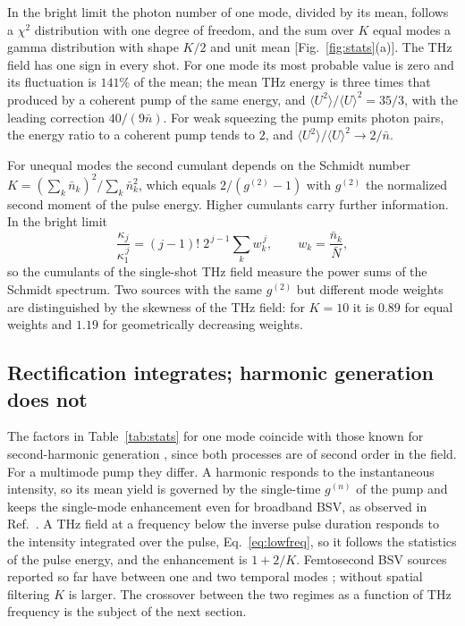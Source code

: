 \documentclass[aps,pra,reprint,superscriptaddress,amsmath,amssymb,floatfix]{revtex4-2}
\newcommand{\nbar}{\bar n}
\newcommand{\Nbar}{\bar N}
\begin{document}
In the bright limit the photon number of one mode, divided by its mean,
follows a $\chi^2$ distribution with one degree of freedom, and the sum over
$K$ equal modes a gamma distribution with shape $K/2$ and unit mean
[Fig.~\ref{fig:stats}(a)]. The THz field has one sign in every shot. For one
mode its most probable value is zero and its fluctuation is $141\%$ of the
mean; the mean THz energy is three times that produced by a coherent pump of
the same energy, and $\langle U^2\rangle/\langle U\rangle^2=35/3$, with the
leading correction $40/(9\nbar)$. For weak squeezing the pump emits photon
pairs, the energy ratio to a coherent pump tends to $2$, and
$\langle U^2\rangle/\langle U\rangle^2\to2/\nbar$.

For unequal modes the second cumulant depends on the Schmidt number
$K=(\sum_k\nbar_k)^2/\sum_k\nbar_k^2$, which equals $2/(g^{(2)}-1)$ with
$g^{(2)}$ the normalized second moment of the pulse energy. Higher cumulants
carry further information. In the bright limit
\begin{equation}
\frac{\kappa_j}{\kappa_1^{\,j}}=(j-1)!\;2^{\,j-1}\sum_kw_k^{\,j},
\qquad w_k=\frac{\nbar_k}{\Nbar},
\label{eq:powersums}
\end{equation}
so the cumulants of the single-shot THz field measure the power sums of the
Schmidt spectrum. Two sources with the same $g^{(2)}$ but different mode
weights are distinguished by the skewness of the THz field: for $K=10$ it is
$0.89$ for equal weights and $1.19$ for geometrically decreasing weights.

\subsection{Rectification integrates; harmonic generation does not}

The factors in Table~\ref{tab:stats} for one mode coincide with those known
for second-harmonic generation \cite{spasibko2017}, since both processes are
of second order in the field. For a multimode pump they differ. A harmonic
responds to the instantaneous intensity, so its mean yield is governed by the
single-time $g^{(n)}$ of the pump and keeps the single-mode enhancement even
for broadband BSV, as observed in Ref.~\cite{spasibko2017}. A THz field at a
frequency below the inverse pulse duration responds to the intensity
integrated over the pulse, Eq.~\eqref{eq:lowfreq}, so it follows the statistics
of the pulse energy, and the enhancement is $1+2/K$. Femtosecond BSV sources
reported so far have between one and two temporal modes
\cite{kern2026,gholammirzaei2026}; without spatial filtering $K$ is larger.
The crossover between the two regimes as a function of THz frequency is the
subject of the next section.
\end{document}
